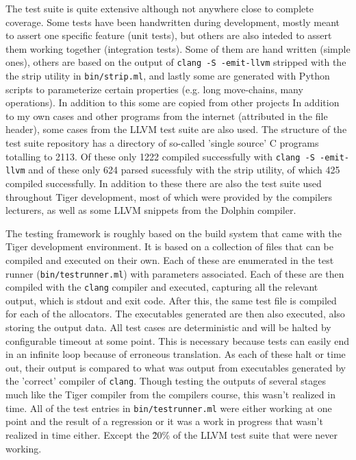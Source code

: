 \documentclass{article}
\begin{document}
The test suite is quite extensive although not anywhere close to complete coverage.
Some tests have been handwritten during development, mostly meant to assert one specific feature (unit tests), but others are also inteded to assert them working together (integration tests). Some of them are hand written (simple ones), others are based on the output of \texttt{clang -S -emit-llvm} stripped with the the strip utility in \texttt{bin/strip.ml}, and lastly some are generated with Python scripts to parameterize certain properties (e.g. long move-chains, many operations). In addition to this some are copied from other projects
In addition to my own cases and other programs from the internet (attributed in the file header), some cases from the LLVM test suite are also used. The structure of the test suite repository has a directory of so-called 'single source' C programs totalling to 2113. Of these only 1222 compiled successfully with \texttt{clang -S -emit-llvm} and of these only 624 parsed sucessfuly with the strip utility, of which 425 compiled successfully. In addition to these there are also the test suite used throughout Tiger development, most of which were provided by the compilers lecturers, as well as some LLVM snippets from the Dolphin compiler.

The testing framework is roughly based on the build system that came with the Tiger development environment. It is based on a collection of files that can be compiled and executed on their own. Each of these are enumerated in the test runner (\texttt{bin/testrunner.ml}) with parameters associated.   Each of these are then compiled with the \texttt{clang} compiler and executed, capturing all the relevant output, which is stdout and exit code. After this, the same test file is compiled for each of the allocators. The executables generated are then also executed, also storing the output data.   All test cases are deterministic and will be  halted by configurable timeout at some point. This is necessary because tests can easily end in an infinite loop because of erroneous translation. As each of these halt or time out, their output is compared to what was output from executables generated by the 'correct' compiler of \texttt{clang}.
Though testing the outputs of several stages much like the Tiger compiler from the compilers course, this wasn't realized in time.
All of the test entries in \texttt{bin/testrunner.ml} were either working at one point and the result of a regression or it was a work in progress that wasn't realized in time either. Except the \~ 20\% of the LLVM test suite that were never working.
\end{document}
